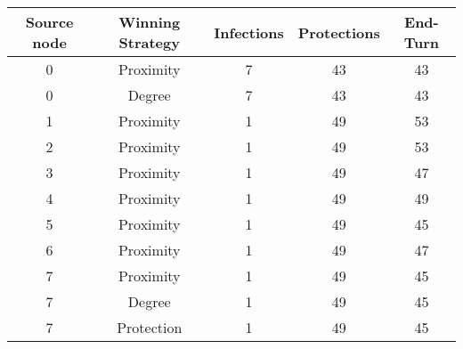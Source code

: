 \documentclass[results.tex]{subfiles}
\begin{document}
    \begin{center}
        \begin{tabular}{| c || c | c | c | c |}
            \hline
            {\bfseries Source node} & {\bfseries Winning Strategy} & {\bfseries Infections} & {\bfseries Protections}
            & {\bfseries End-Turn}
            \\  %
            \hline\hline
            0                       & Proximity                    & 7                      & 43                      & 43                   \\
            \hline
            0                       & Degree                       & 7                      & 43                      & 43                   \\
            \hline
            1                       & Proximity                    & 1                      & 49                      & 53                   \\
            \hline
            2                       & Proximity                    & 1                      & 49                      & 53                   \\
            \hline
            3                       & Proximity                    & 1                      & 49                      & 47                   \\
            \hline
            4                       & Proximity                    & 1                      & 49                      & 49                   \\
            \hline
            5                       & Proximity                    & 1                      & 49                      & 45                   \\
            \hline
            6                       & Proximity                    & 1                      & 49                      & 47                   \\
            \hline
            7                       & Proximity                    & 1                      & 49                      & 45                   \\
            \hline
            7                       & Degree                       & 1                      & 49                      & 45                   \\
            \hline
            7                       & Protection                   & 1                      & 49                      & 45                   \\

\end{tabular}
\end{center}
\end{document}
